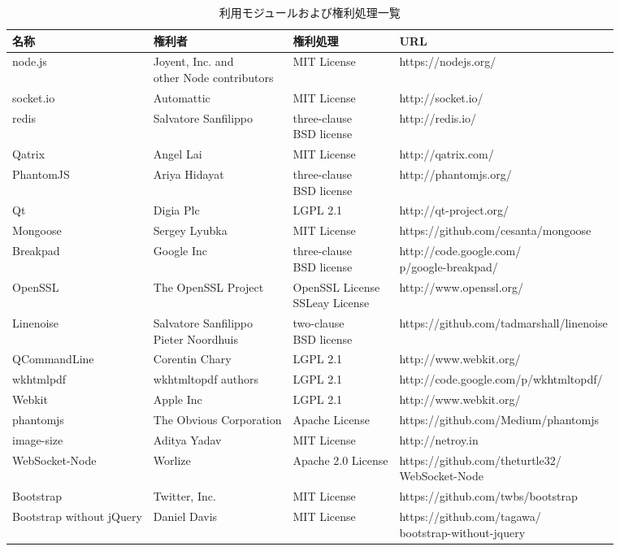 \documentclass[a4paper,10pt,oneside]{jsbook}
\begin{document}
\begin{table}[htbp]
\begin{center}
\caption{利用モジュールおよび権利処理一覧}
\label{ops}
\begin{tabular}{|l|l|l|l|}
\hline
名称 & 権利者 & 権利処理 & URL \\
\hline
\hline
node.js & \shortstack[l]{Joyent, Inc. and \\ other Node contributors} & MIT License & https://nodejs.org/ \\
\hline
socket.io & Automattic & MIT License & http://socket.io/  \\
\hline
redis & Salvatore Sanfilippo & \shortstack[l]{three-clause\\BSD license} & http://redis.io/ \\
\hline
Qatrix & Angel Lai &  MIT License & http://qatrix.com/\\
\hline
PhantomJS & Ariya Hidayat & \shortstack[l]{three-clause\\BSD license}  & http://phantomjs.org/\\
\hline
Qt & Digia Plc  & LGPL 2.1 & http://qt-project.org/\\
\hline
Mongoose & Sergey Lyubka  & MIT License & https://github.com/cesanta/mongoose\\
\hline
Breakpad & Google Inc & \shortstack[l]{three-clause\\BSD license} & \shortstack[l]{http://code.google.com/\\p/google-breakpad/}\\
\hline
OpenSSL & The OpenSSL Project & \shortstack[l]{OpenSSL License\\SSLeay License} & http://www.openssl.org/\\
\hline
Linenoise & \shortstack[l]{Salvatore Sanfilippo\\Pieter Noordhuis} & \shortstack[l]{two-clause\\BSD license} & https://github.com/tadmarshall/linenoise\\
\hline
QCommandLine & Corentin Chary  & LGPL 2.1 & http://www.webkit.org/\\
\hline
wkhtmlpdf & wkhtmltopdf authors & LGPL 2.1 & http://code.google.com/p/wkhtmltopdf/\\
\hline
Webkit & Apple Inc  & LGPL 2.1 & http://www.webkit.org/\\
\hline
phantomjs & The Obvious Corporation & Apache License & https://github.com/Medium/phantomjs\\
\hline
image-size & Aditya Yadav & MIT License & http://netroy.in\\
\hline
WebSocket-Node & Worlize & Apache 2.0 License & \shortstack[l]{https://github.com/theturtle32/\\WebSocket-Node}\\
\hline
Bootstrap & Twitter, Inc. &  MIT License & https://github.com/twbs/bootstrap\\
\hline
Bootstrap without jQuery & Daniel Davis &  MIT License & \shortstack[l]{https://github.com/tagawa/\\bootstrap-without-jquery}\\
\hline


\end{tabular}
\end{center}
\end{table}
\end{document}
